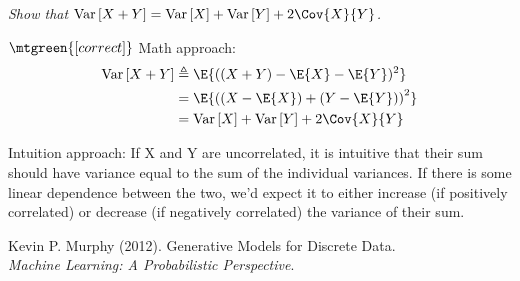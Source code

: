 \documentclass[11pt]{article}
\newcommand\Var[1]{\mathrm{Var}\left[#1\right]}
\begin{document}
\begin{example}
	{\itshape
		Show that $\Var{X + Y} = \Var{X} + \Var{Y} + 2 \Cov{X}{Y}$.
	}

$\mtgreen{[correct]}$ Math approach:
	\begin{align}
		\Var{X + Y}
			&\triangleq \E{((X + Y) - \E{X} - \E{Y})^2} \\
			&= \E{\left(
					(X - \E{X}) +
					(Y - \E{Y})
				\right)^2} \\
			&= \Var{X} + \Var{Y} + 2 \Cov{X}{Y} 
	\end{align}
	
\vspace{1em}

Intuition approach: If X and Y are uncorrelated, it is intuitive that their sum should have variance equal to the sum of the individual variances. If there is some linear dependence between the two, we'd expect it to either increase (if positively correlated) or decrease (if negatively correlated) the variance of their sum.  
\end{example}










\vspace{-1.7em}
{\scriptsize Kevin P. Murphy (2012). Generative Models for Discrete Data.\\ \textit{Machine Learning: A Probabilistic Perspective}.\\ }
\end{document}
